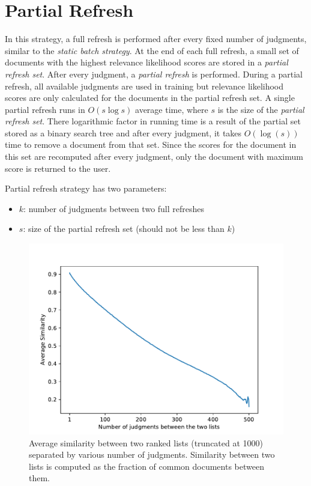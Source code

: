 \section{Partial Refresh}

In this strategy, a full refresh is performed after every fixed number of
judgments, similar to the \textit{static batch strategy}. At the end of each
full refresh, a small set of documents with the highest relevance likelihood
scores are stored in a \textit{partial refresh set}. After every judgment, a
\textit{partial refresh} is performed. During a partial refresh, all available
judgments are used in training but relevance likelihood scores are only
calculated for the documents in the partial refresh set. A single partial
refresh runs in $O(s\log{s})$ average time, where $s$ is the size of the
\textit{partial refresh set}. There logarithmic factor in running time
is a result of the partial set stored as a binary search tree and after every
judgment, it takes $O(\log(s))$ time to remove a document from that set. Since
the scores for the document in this set are recomputed after every
judgment, only the document with maximum score is returned to the user.

Partial refresh strategy has two parameters:
\begin{itemize}
    \item $k$: number of judgments between two full refreshes
    \item $s$: size of the partial refresh set (should not be less than $k$)
\end{itemize}

\begin{figure}[]
\includegraphics[width=\textwidth]{plots/ranklist_similarity.pdf}
\caption{Average similarity between two ranked lists (truncated at 1000)
separated by various number of judgments. Similarity between two lists is
computed as the fraction of common documents between them.}
\label{plot:partial}
\end{figure}

